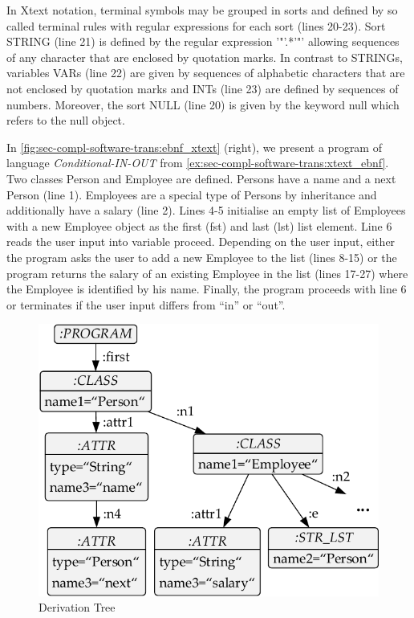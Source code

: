 \begin{example}
In Xtext notation, terminal symbols may be grouped in sorts and defined by so called terminal rules with regular expressions for each sort (lines 20-23).
Sort \textsf{STRING} (line 21) is defined by the regular expression \textsf{'"'.*'"'} allowing sequences of any character that are enclosed by quotation marks.
In contrast to \textsf{STRING}s, variables \textsf{VAR}s (line 22) are given by sequences of alphabetic characters that are not enclosed by quotation marks and \textsf{INT}s (line 23) are defined by sequences of numbers.
Moreover, the sort \textsf{NULL} (line 20) is given by the keyword \textsf{null} which refers to the null object.
\envEndMarker
\end{example}

\begin{example}
\label{ex:sec-compl-software-trans:prog}
In \cref{fig:sec-compl-software-trans:ebnf_xtext} (right), we present a program of language \textit{Conditional-IN-OUT} from \cref{ex:sec-compl-software-trans:xtext_ebnf}.
Two classes \textsf{Person} and \textsf{Employee} are defined.
\textsf{Person}s have a \textsf{name} and a \textsf{next} \textsf{Person} (line 1).
\textsf{Employees} are a special type of \textsf{Person}s by inheritance and additionally have a \textsf{salary} (line 2).
Lines 4-5 initialise an empty list of \textsf{Employee}s with a new \textsf{Employee} object as the first (\textsf{fst}) and last (\textsf{lst}) list element.
Line 6 reads the user input into variable \textsf{proceed}.
Depending on the user input, either the program asks the user to add a new \textsf{Employee} to the list (lines 8-15) or the program returns the \textsf{salary} of an existing \textsf{Employee} in the list (lines 17-27) where the \textsf{Employee} is identified by his \textsf{name}.
Finally, the program proceeds with line 6 or terminates if the user input differs from \textsf{``in''} or \textsf{``out''}.
\envEndMarker
\end{example}

\begin{figure}[!tb]
\centering
\includegraphics[width=.47\textwidth]{img/software_trans/ast1.pdf}
\caption{Derivation Tree}
\label{fig:sec-compl-software-trans:ast}
\end{figure}

